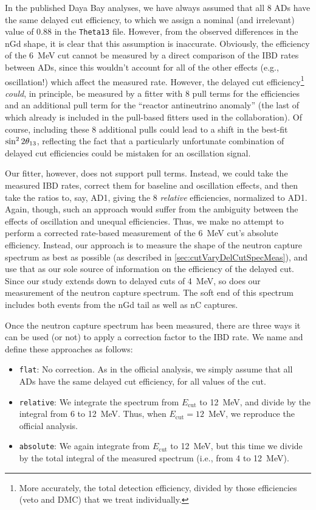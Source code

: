 \documentclass[../thesis.tex]{subfiles}
\begin{document}
In the published Daya Bay analyses, we have always assumed that all 8 ADs have the same delayed cut efficiency, to which we assign a nominal (and irrelevant) value of 0.88 in the \texttt{Theta13} file. However, from the observed differences in the nGd shape, it is clear that this assumption is inaccurate. Obviously, the efficiency of the 6~MeV cut cannot be measured by a direct comparison of the IBD rates between ADs, since this wouldn't account for all of the other effects (e.g., oscillation!) which affect the measured rate. However, the delayed cut efficiency\footnote{More accurately, the total detection efficiency, divided by those efficiencies (veto and DMC) that we treat individually.} \emph{could}, in principle, be measured by a fitter with 8 pull terms for the efficiencies and an additional pull term for the ``reactor antineutrino anomaly'' (the last of which already is included in the pull-based fitters used in the collaboration). Of course, including these 8 additional pulls could lead to a shift in the best-fit $\sin^2 2\theta_{13}$, reflecting the fact that a particularly unfortunate combination of delayed cut efficiencies could be mistaken for an oscillation signal.

Our fitter, however, does not support pull terms. Instead, we could take the measured IBD rates, correct them for baseline and oscillation effects, and then take the ratios to, say, AD1, giving the 8 \emph{relative} efficiencies, normalized to AD1. Again, though, such an approach would suffer from the ambiguity between the effects of oscillation and unequal efficiencies. Thus, we make no attempt to perform a corrected rate-based measurement of the 6~MeV cut's absolute efficiency. Instead, our approach is to measure the shape of the neutron capture spectrum as best as possible (as described in \autoref{sec:cutVaryDelCutSpecMeas}), and use that as our sole source of information on the efficiency of the delayed cut. Since our study extends down to delayed cuts of 4~MeV, so does our measurement of the neutron capture spectrum. The soft end of this spectrum includes both events from the nGd tail as well as nC captures.

Once the neutron capture spectrum has been measured, there are three ways it can be used (or not) to apply a correction factor to the IBD rate. We name and define these approaches as follows:

\begin{itemize}
\item \texttt{flat}: No correction. As in the official analysis, we simply assume that all ADs have the same delayed cut efficiency, for all values of the cut.
\item \texttt{relative}: We integrate the spectrum from $E_{\mathrm{cut}}$ to 12~MeV, and divide by the integral from 6 to 12~MeV. Thus, when $E_{\mathrm{cut}} = 12$~MeV, we reproduce the official analysis.
\item \texttt{absolute}: We again integrate from $E_{\mathrm{cut}}$ to 12~MeV, but this time we divide by the total integral of the measured spectrum (i.e., from 4 to 12~MeV).
\end{itemize}
\end{document}
